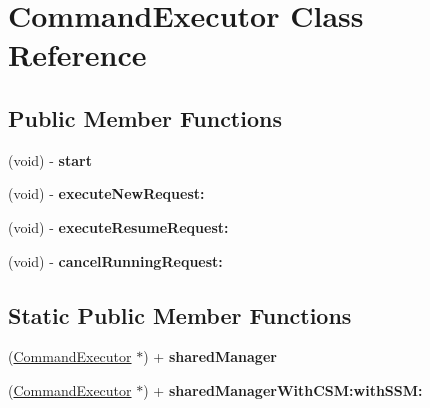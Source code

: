\hypertarget{interface_command_executor}{
\section{CommandExecutor Class Reference}
\label{interface_command_executor}
}
\subsection*{Public Member Functions}
\begin{DoxyCompactItemize}
\item 
\hypertarget{interface_command_executor_a60de64d75454385b23995437f1d72669}{
(void) -\/ {\bfseries start}}
\label{interface_command_executor_a60de64d75454385b23995437f1d72669}

\item 
\hypertarget{interface_command_executor_ad5043a24255829ab6faa736f203f4863}{
(void) -\/ {\bfseries executeNewRequest:}}
\label{interface_command_executor_ad5043a24255829ab6faa736f203f4863}

\item 
\hypertarget{interface_command_executor_a417e34330f53a625fc9a32e63fe00359}{
(void) -\/ {\bfseries executeResumeRequest:}}
\label{interface_command_executor_a417e34330f53a625fc9a32e63fe00359}

\item 
\hypertarget{interface_command_executor_aea90220bc2e4907531e324730c2ab817}{
(void) -\/ {\bfseries cancelRunningRequest:}}
\label{interface_command_executor_aea90220bc2e4907531e324730c2ab817}

\end{DoxyCompactItemize}
\subsection*{Static Public Member Functions}
\begin{DoxyCompactItemize}
\item 
\hypertarget{interface_command_executor_adb9d85d30e8c77b2867078f3550f6b36}{
(\hyperlink{interface_command_executor}{CommandExecutor} $\ast$) + {\bfseries sharedManager}}
\label{interface_command_executor_adb9d85d30e8c77b2867078f3550f6b36}

\item 
\hypertarget{interface_command_executor_a4a72b58e1d5247a7bde9df3edd8cf4ea}{
(\hyperlink{interface_command_executor}{CommandExecutor} $\ast$) + {\bfseries sharedManagerWithCSM:withSSM:}}
\label{interface_command_executor_a4a72b58e1d5247a7bde9df3edd8cf4ea}

\end{DoxyCompactItemize}
